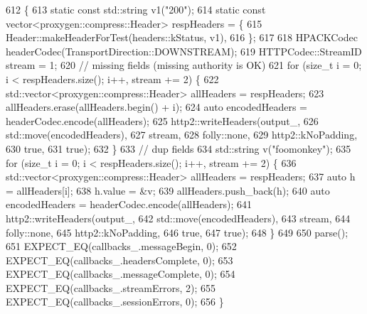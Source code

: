 \begin{DoxyCode}
612                                         \{
613   \textcolor{keyword}{static} \textcolor{keyword}{const} std::string v1(\textcolor{stringliteral}{"200"});
614   \textcolor{keyword}{static} \textcolor{keyword}{const} vector<proxygen::compress::Header> respHeaders = \{
615     Header::makeHeaderForTest(headers::kStatus, v1),
616   \};
617 
618   HPACKCodec headerCodec(TransportDirection::DOWNSTREAM);
619   HTTPCodec::StreamID stream = 1;
620   \textcolor{comment}{// missing fields (missing authority is OK)}
621   \textcolor{keywordflow}{for} (\textcolor{keywordtype}{size\_t} i = 0; i < respHeaders.size(); i++, stream += 2) \{
622     std::vector<proxygen::compress::Header> allHeaders = respHeaders;
623     allHeaders.erase(allHeaders.begin() + i);
624     \textcolor{keyword}{auto} encodedHeaders = headerCodec.encode(allHeaders);
625     http2::writeHeaders(output\_,
626                         std::move(encodedHeaders),
627                         stream,
628                         folly::none,
629                         http2::kNoPadding,
630                         \textcolor{keyword}{true},
631                         \textcolor{keyword}{true});
632   \}
633   \textcolor{comment}{// dup fields}
634   std::string v(\textcolor{stringliteral}{"foomonkey"});
635   \textcolor{keywordflow}{for} (\textcolor{keywordtype}{size\_t} i = 0; i < respHeaders.size(); i++, stream += 2) \{
636     std::vector<proxygen::compress::Header> allHeaders = respHeaders;
637     \textcolor{keyword}{auto} h = allHeaders[i];
638     h.value = &v;
639     allHeaders.push\_back(h);
640     \textcolor{keyword}{auto} encodedHeaders = headerCodec.encode(allHeaders);
641     http2::writeHeaders(output\_,
642                         std::move(encodedHeaders),
643                         stream,
644                         folly::none,
645                         http2::kNoPadding,
646                         \textcolor{keyword}{true},
647                         \textcolor{keyword}{true});
648   \}
649 
650   parse();
651   EXPECT\_EQ(callbacks\_.messageBegin, 0);
652   EXPECT\_EQ(callbacks\_.headersComplete, 0);
653   EXPECT\_EQ(callbacks\_.messageComplete, 0);
654   EXPECT\_EQ(callbacks\_.streamErrors, 2);
655   EXPECT\_EQ(callbacks\_.sessionErrors, 0);
656 \}
\end{DoxyCode}
